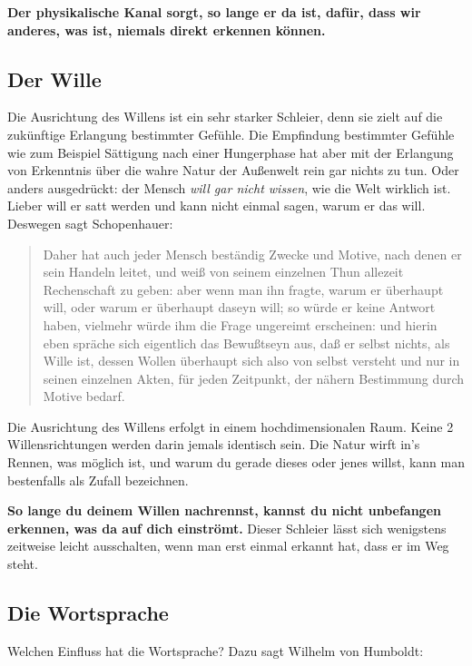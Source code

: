 \documentclass[12pt]{book}
\begin{document}
\textbf{Der physikalische Kanal sorgt, so lange er da ist, dafür, dass wir anderes, was ist, niemals direkt erkennen können.}

\subsection{Der Wille}

Die Ausrichtung des Willens ist ein sehr starker Schleier, denn sie zielt auf die zukünftige Erlangung bestimmter Gefühle. Die Empfindung bestimmter Gefühle wie zum Beispiel Sättigung nach einer Hungerphase hat aber mit der Erlangung von Erkenntnis über die wahre Natur der Außenwelt rein gar nichts zu tun. Oder anders ausgedrückt: der Mensch \emph{will gar nicht wissen}, wie die Welt wirklich ist. Lieber will er satt werden und kann nicht einmal sagen, warum er das will. Deswegen sagt Schopenhauer:

\begin{quote}\begin{tcolorbox}
Daher hat auch jeder Mensch beständig Zwecke und Motive, nach denen er sein Handeln leitet, und weiß von seinem einzelnen Thun allezeit Rechenschaft zu geben: aber wenn man ihn fragte, warum er überhaupt will, oder warum er überhaupt daseyn will; so würde er keine Antwort haben, vielmehr würde ihm die Frage ungereimt erscheinen: und hierin eben spräche sich eigentlich das Bewußtseyn aus, daß er selbst nichts, als Wille ist, dessen Wollen überhaupt sich also von selbst versteht und nur in seinen einzelnen Akten, für jeden Zeitpunkt, der nähern Bestimmung durch Motive bedarf.
\end{tcolorbox}\end{quote}

Die Ausrichtung des Willens erfolgt in einem hochdimensionalen Raum. Keine 2 Willensrichtungen werden darin jemals identisch sein. Die Natur wirft in's Rennen, was möglich ist, und warum du gerade dieses oder jenes willst, kann man bestenfalls als Zufall bezeichnen.

\textbf{So lange du deinem Willen nachrennst, kannst du nicht unbefangen erkennen, was da auf dich einströmt.} Dieser Schleier lässt sich wenigstens zeitweise leicht ausschalten, wenn man erst einmal erkannt hat, dass er im Weg steht.

\subsection{Die Wortsprache}

Welchen Einfluss hat die Wortsprache? Dazu sagt Wilhelm von Humboldt:
\end{document}
